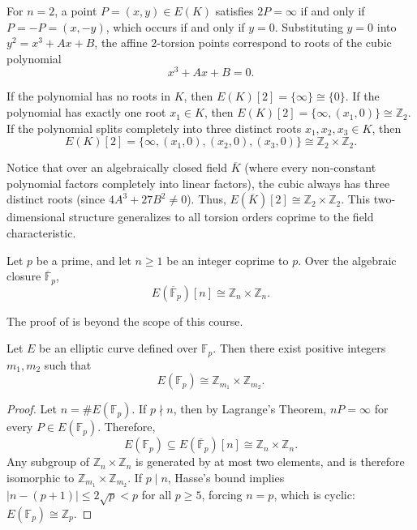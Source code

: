 \begin{example}
    For \(n = 2\), a point \(P = (x, y) \in E(K)\) satisfies \(2P = \infty\) if and only if \(P = -P = (x, -y)\), which occurs if and only if \(y = 0\).
    Substituting \(y = 0\) into \(y^2 = x^3 + Ax + B\), the affine \(2\)-torsion points correspond to roots of the cubic polynomial
    \[
        x^3 + Ax + B = 0.
    \]

    If the polynomial has no roots in \(K\), then \(E(K)[2] = \{ \infty \} \cong \{0\}\).
    If the polynomial has exactly one root \(x_1 \in K\), then \(E(K)[2] = \{ \infty, (x_1, 0) \} \cong \mathbb{Z}_2\).
    If the polynomial splits completely into three distinct roots \(x_1, x_2, x_3 \in K\), then
    \[
        E(K)[2] = \{ \infty, (x_1, 0), (x_2, 0), (x_3, 0) \} \cong \mathbb{Z}_2 \times \mathbb{Z}_2.
    \]
\end{example}

Notice that over an algebraically closed field \(\overline{K}\) (where every non-constant polynomial factors completely into linear factors), the cubic always has three distinct roots (since \(4A^3 + 27B^2 \neq 0\)).
Thus, \(E(\overline{K})[2] \cong \mathbb{Z}_2 \times \mathbb{Z}_2\).
This two-dimensional structure generalizes to all torsion orders coprime to the field characteristic.

\begin{theorem}\label{thm:full-torsion}
    Let \(p\) be a prime, and let \(n \geq 1\) be an integer coprime to \(p\).
    Over the algebraic closure \(\overline{\mathbb{F}}_p\),
    \[
        E(\overline{\mathbb{F}}_p)[n] \cong \mathbb{Z}_n \times \mathbb{Z}_n.
    \]
\end{theorem}

The proof of  is beyond the scope of this course.

\begin{corollary}\label{cor:ec-group-structure}
    Let \(E\) be an elliptic curve defined over \(\mathbb{F}_p\). Then there exist positive integers \(m_1, m_2\) such that
    \[
        E(\mathbb{F}_p) \cong \mathbb{Z}_{m_1} \times \mathbb{Z}_{m_2}.
    \]
\end{corollary}

\begin{proof}
    Let \(n = \#E(\mathbb{F}_p)\).
    If \(p \nmid n\), then by Lagrange's Theorem, \(nP = \infty\) for every \(P \in E(\mathbb{F}_p)\).
    Therefore,
    \[
        E(\mathbb{F}_p) \subseteq E(\overline{\mathbb{F}}_p)[n] \cong \mathbb{Z}_n \times \mathbb{Z}_n.
    \]
    Any subgroup of \(\mathbb{Z}_n \times \mathbb{Z}_n\) is generated by at most two elements, and is therefore isomorphic to \(\mathbb{Z}_{m_1} \times \mathbb{Z}_{m_2}\).
    If \(p \mid n\), Hasse's bound implies \(|n - (p + 1)| \leq 2\sqrt{p} < p\) for all \(p \geq 5\), forcing \(n = p\), which is cyclic: \(E(\mathbb{F}_p) \cong \mathbb{Z}_p\).
\end{proof}

